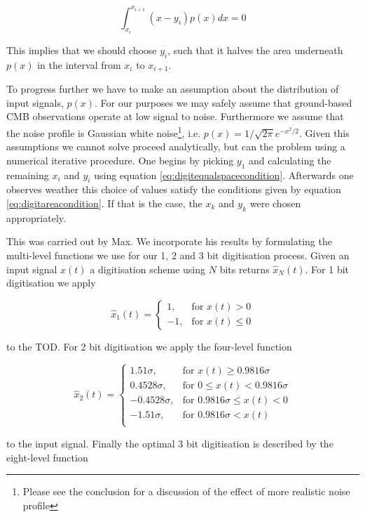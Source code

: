 \documentclass[apj]{emulateapj}
\begin{document}
\begin{equation} \label{eq:digitareacondition}
\int_{x_i}^{x_{i+1}} \left( x-y_i \right) p(x) dx = 0
\end{equation}

This implies that we should choose $y_i$, such that it halves the area underneath $p(x)$ in the interval from $x_i$ to $x_{i+1}$.

To progress further we have to make an assumption about the distribution of input signals, $p(x)$. For our purposes we may safely assume that ground-based CMB observations operate at low signal to noise. Furthermore we assume that the noise profile is Gaussian white noise\footnote{Please see the conclusion for a discussion of the effect of more realistic noise profile}, i.e. $p(x) = 1/\sqrt{2\pi} e^{-x^2/2}$. Given this assumptions we cannot solve proceed analytically, but can the problem using a numerical iterative procedure. One begins by picking $y_1$ and calculating the remaining $x_i$ and $y_i$ using equation \ref{eq:digitequalspacecondition}. Afterwards one observes weather this choice of values satisfy the conditions given by equation \ref{eq:digitareacondition}. If that is the case, the $x_k$ and $y_k$ were chosen appropriately.

This was carried out by Max. We incorporate his results by formulating the multi-level functions we use for our 1, 2 and 3 bit digitisation process. Given an input signal $x(t)$ a digitisation scheme using $N$ bits returns $\hat{x}_N(t)$. For 1 bit digitisation we apply 

\[ \hat{x}_1(t) = \left\{ \begin{array}{lr}
1, & \text{for } x(t) > 0\\
-1, & \text{for } x(t) \leq 0
\end{array} \right. \]

to the TOD. For 2 bit digitisation we apply the four-level function

\[ \hat{x}_2(t) = \left\{ \begin{array}{rl}
1.51 \sigma, & \text{for } x(t) \geq 0.9816 \sigma\\
0.4528 \sigma, & \text{for } 0 \leq x(t) < 0.9816 \sigma\\
-0.4528 \sigma, & \text{for } 0.9816 \sigma \leq x(t) < 0\\
-1.51 \sigma, & \text{for } 0.9816 \sigma < x(t)\\
\end{array} \right. \]

to the input signal. Finally the optimal 3 bit digitisation is described by the eight-level function
\end{document}
